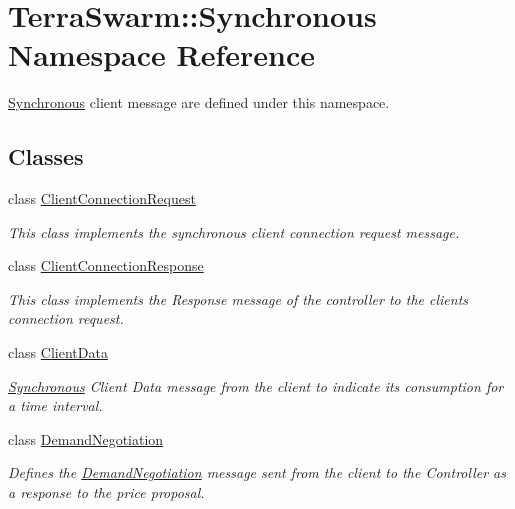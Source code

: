\hypertarget{namespace_terra_swarm_1_1_synchronous}{\section{Terra\-Swarm\-:\-:Synchronous Namespace Reference}
\label{namespace_terra_swarm_1_1_synchronous}
}


\hyperlink{namespace_terra_swarm_1_1_synchronous}{Synchronous} client message are defined under this namespace.  


\subsection*{Classes}
\begin{DoxyCompactItemize}
\item 
class \hyperlink{class_terra_swarm_1_1_synchronous_1_1_client_connection_request}{Client\-Connection\-Request}
\begin{DoxyCompactList}\small\item\em This class implements the synchronous client connection request message. \end{DoxyCompactList}\item 
class \hyperlink{class_terra_swarm_1_1_synchronous_1_1_client_connection_response}{Client\-Connection\-Response}
\begin{DoxyCompactList}\small\item\em This class implements the Response message of the controller to the clients connection request. \end{DoxyCompactList}\item 
class \hyperlink{class_terra_swarm_1_1_synchronous_1_1_client_data}{Client\-Data}
\begin{DoxyCompactList}\small\item\em \hyperlink{namespace_terra_swarm_1_1_synchronous}{Synchronous} Client Data message from the client to indicate its consumption for a time interval. \end{DoxyCompactList}\item 
class \hyperlink{class_terra_swarm_1_1_synchronous_1_1_demand_negotiation}{Demand\-Negotiation}
\begin{DoxyCompactList}\small\item\em Defines the \hyperlink{class_terra_swarm_1_1_synchronous_1_1_demand_negotiation}{Demand\-Negotiation} message sent from the client to the Controller as a response to the price proposal. \end{DoxyCompactList}\item 

\end{DoxyCompactItemize}
